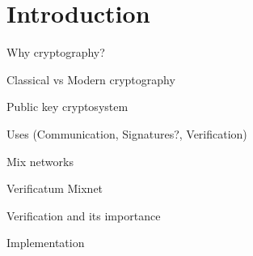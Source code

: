 \section{Introduction}
Why cryptography?

Classical vs Modern cryptography

Public key cryptosystem

Uses (Communication, Signatures?, Verification)

Mix networks

Verificatum Mixnet

Verification and its importance

Implementation